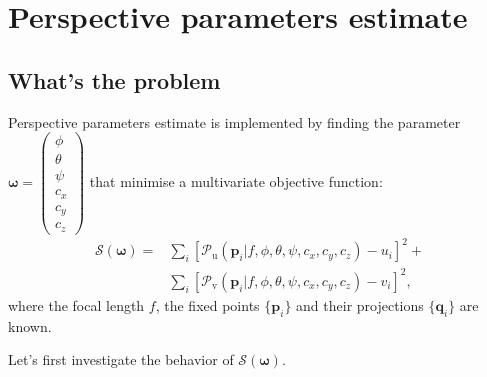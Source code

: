 \documentclass{article}
\renewcommand{\vec}[1]{\mathbf{#1}}
\newcommand{\pu}[1]{\mathscr{P}_\mathrm{u}\left(#1\right)}
\newcommand{\pv}[1]{\mathscr{P}_\mathrm{v}\left(#1\right)}
\newcommand{\bomega}{\boldsymbol{\omega}}
\begin{document}
\section{Perspective parameters estimate}
\subsection{What's the problem}
Perspective parameters estimate is implemented by finding the parameter $\bomega=\begin{pmatrix}\phi \\ \theta \\ \psi \\ c_x \\ c_y \\ c_z \end{pmatrix}$ that minimise a multivariate objective function:
\begin{equation}
  \begin{split}
    \mathcal{S}\left( \bomega \right) = & \sum_i \left[ \pu{\vec{p}_i | f, \phi, \theta, \psi, c_x, c_y, c_z } - u_i \right]^2 + \\
      &\sum_i\left[\pv{\vec{p}_i | f, \phi, \theta, \psi, c_x, c_y, c_z} - v_i \right]^2 \text{,}
  \end{split}
\end{equation}
where the focal length $f$, the fixed points $\{\vec{p}_i\}$ and their projections $\{\vec{q}_i\}$ are known.

Let's first investigate the behavior of $\mathcal{S}\left(\bomega\right)$.
\end{document}
